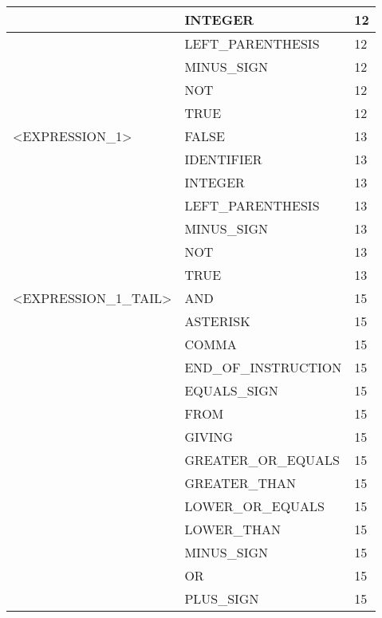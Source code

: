 \begin{longtable}{|l|l|l|}
                     &   INTEGER              &   12 \\ \hline
                     &   LEFT\_PARENTHESIS     &   12 \\ \hline
                     &   MINUS\_SIGN           &   12 \\ \hline
                     &   NOT                  &   12 \\ \hline
                     &   TRUE                 &   12 \\ \hline
<EXPRESSION\_1>      &   FALSE                &   13 \\ \hline
                     &   IDENTIFIER           &   13 \\ \hline
                     &   INTEGER              &   13 \\ \hline
                     &   LEFT\_PARENTHESIS     &   13 \\ \hline
                     &   MINUS\_SIGN           &   13 \\ \hline
                     &   NOT                  &   13 \\ \hline
                     &   TRUE                 &   13 \\ \hline
<EXPRESSION\_1\_TAIL>&   AND                  &   15 \\ \hline
                     &   ASTERISK             &   15 \\ \hline
                     &   COMMA                &   15 \\ \hline
                     &   END\_OF\_INSTRUCTION   &   15 \\ \hline
                     &   EQUALS\_SIGN          &   15 \\ \hline
                     &   FROM                 &   15 \\ \hline
                     &   GIVING               &   15 \\ \hline
                     &   GREATER\_OR\_EQUALS    &   15 \\ \hline
                     &   GREATER\_THAN         &   15 \\ \hline
                     &   LOWER\_OR\_EQUALS      &   15 \\ \hline
                     &   LOWER\_THAN           &   15 \\ \hline
                     &   MINUS\_SIGN           &   15 \\ \hline
                     &   OR                   &   15 \\ \hline
                     &   PLUS\_SIGN            &   15 \\ \hline

\end{longtable}
